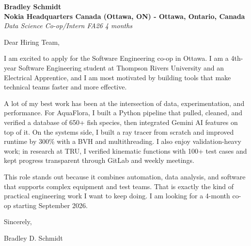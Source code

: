 \documentclass[11pt]{article}
\begin{document}
\textbf{Bradley Schmidt}\\
\vspace{0.5em}
\textbf{Nokia Headquarters Canada (Ottawa, ON) - Ottawa, Ontario, Canada}\\
\textit{Data Science Co-op/Intern FA26 4 months}

Dear Hiring Team,

\par

I am excited to apply for the Software Engineering co-op in Ottawa. I am a 4th-year Software Engineering student at Thompson Rivers University and an Electrical Apprentice, and I am most motivated by building tools that make technical teams faster and more effective.

\par

A lot of my best work has been at the intersection of data, experimentation, and performance. For AquaFlora, I built a Python pipeline that pulled, cleaned, and verified a database of 650+ fish species, then integrated Gemini AI features on top of it. On the systems side, I built a ray tracer from scratch and improved runtime by 300\% with a BVH and multithreading. I also enjoy validation-heavy work; in research at TRU, I verified kinematic functions with 100+ test cases and kept progress transparent through GitLab and weekly meetings.

\par

This role stands out because it combines automation, data analysis, and software that supports complex equipment and test teams. That is exactly the kind of practical engineering work I want to keep doing. I am looking for a 4-month co-op starting September 2026.

\par

Sincerely,

\par

Bradley D. Schmidt
\end{document}
